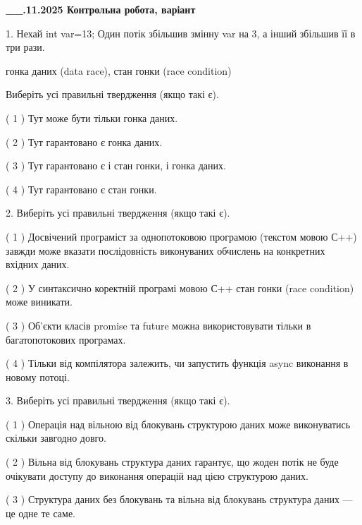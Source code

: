 \documentclass[12pt, ukrainian]{article}
\begin{document}
\begin {large}

\textbf{\_\_.11.2025 Контрольна робота, варіант  }\par


{
1. Нехай int var=13; Один потік збільшив змінну var на 3, а інший збільшив її в три рази.

гонка даних (data race), стан гонки (race condition)

Виберіть усі правильні твердження (якщо такі є).\par
\vspace{2mm}
( 1 ) Тут може бути тільки гонка даних.%

( 2 ) Тут гарантовано є гонка даних.%

( 3 ) Тут гарантовано є і стан гонки, і гонка даних.%

( 4 ) Тут гарантовано є стан гонки.%


2. Виберіть усі правильні твердження (якщо такі є).\par
\vspace{2mm}

( 1 ) Досвічений програміст за однопотоковою програмою (текстом мовою С++) завжди може вказати послідовність виконуваних обчислень на конкретних вхідних даних.%

( 2 ) У синтаксично коректній програмі мовою С++ стан гонки (race condition) може виникати.%

( 3 ) Об’єкти класів promise та future можна використовувати тільки в багатопотокових програмах.%

( 4 ) Тільки від компілятора залежить, чи запустить функція async виконання в новому потоці.%


3. Виберіть усі правильні твердження (якщо такі є).\par
\vspace{2mm}

( 1 ) Операція над вільною від блокувань структурою даних може виконуватись скільки завгодно довго.%

( 2 ) Вільна від блокувань структура даних гарантує, що жоден потік не буде очікувати доступу до виконання операцій над цією структурою даних.%

( 3 ) Структура даних без блокувань та вільна від блокувань структура даних --- це одне те саме.%

}
\end{large}
\end{document}

